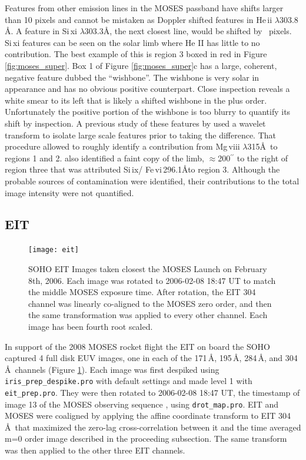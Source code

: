 		
		Features from other emission lines in the MOSES passband have shifts larger than 10 pixels and cannot be mistaken as Doppler shifted features in He\,{\sc ii}  $\lambda303.8$ \AA. 
		A feature in Si\,{\sc xi} $\lambda$303.3\AA, the next closest line, would be shifted by \sixipix\ pixels. 
		Si\,{\sc xi} features can be seen on the solar limb where He II has little to no contribution. 
		The best example of this is region 3 boxed in red in Figure \ref{fig:moses_super}.  
		Box 1 of Figure \ref{fig:moses_super}c has a large, coherent, negative feature dubbed the ``wishbone''.  
		The wishbone is very solar in appearance and has no obvious positive counterpart.  
		Close inspection reveals a white smear to its left that is likely a shifted wishbone in the plus order.  
		Unfortunately the positive portion of the wishbone is too blurry to quantify its shift by inspection. 
		A previous study of these features by \citet{Rust2017} used a wavelet transform to isolate large scale features prior to taking the difference.  
		That procedure allowed \citet{Rust2017} to roughly identify a contribution from Mg\,{\sc viii} $\lambda$315\AA \  to regions 1 and 2.
		\citet{Rust2017} also identified a faint copy of the limb, $\approx$200$^{\prime\prime}$ to the right of region three that was attributed Si\,{\sc ix}/ Fe\,{\sc vi}\,296.1\AA to region 3.
		Although the probable sources of contamination were identified, their contributions to the total image intensity were not quantified.
	
	\subsection{EIT}\label{sec:EIT_data}
		\begin{figure}
			\centering
			\texttt{[image: eit]}
			\caption{SOHO EIT Images taken closest the MOSES Launch on February 8th, 2006. Each image was rotated to 2006-02-08 18:47 UT to match the middle MOSES exposure time.  After rotation, the EIT 304 channel was linearly co-aligned to the MOSES zero order, and then the same transformation was applied to every other channel.  Each image has been fourth root scaled.}
			\label{fig:EIT}
		\end{figure}
	
		In support of the 2008 MOSES rocket flight the \acl{EIT} \citep[EIT:][]{EIT} on board the \ac{SOHO} captured 4 full disk EUV images, one in each of the 171\,\AA, 195\,\AA, 284\,\AA, and 304\,\AA\ channels (Figure \ref{fig:EIT}). 
		Each image was first despiked using \texttt{iris\_prep\_despike.pro} with default settings and made level 1 with \texttt{eit\_prep.pro}. 
		They were then rotated to 2006-02-08 18:47 UT, the timestamp of image 13 of the MOSES observing sequence \citep{Fox2011}, using \texttt{drot\_map.pro}.
		EIT and MOSES were coaligned by applying the affine coordinate transform to EIT 304\,\AA\ that maximized the zero-lag cross-correlation between it and the time averaged m=0 order image described in the proceeding subsection.
		The same transform was then applied to the other three EIT channels.
	 

